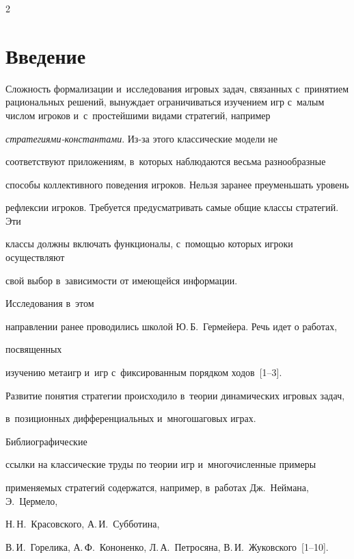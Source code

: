 \thispagestyle{headings}



\begin{multicols}{2}



\label{st\stat}



\section{Введение}



    Сложность формализации и~исследования игровых задач, связанных с~принятием рациональных решений, вынуждает ограничиваться изучением игр с~малым числом игроков и~с~простейшими видами стратегий, например

    \textit{стра\-те\-ги\-ями-констан\-та\-ми}. Из-за этого классические модели не

соответствуют приложениям, в~которых наблюдаются весьма разнообразные

способы коллективного поведения игроков. Нельзя заранее преуменьшать уровень

рефлексии игроков. Требуется предусмат\-ри\-вать самые общие классы стратегий. Эти

классы должны включать функционалы, с~помощью которых игроки осуществляют

свой выбор в~зависимости от имеющейся информации.

Исследования в~этом

направлении ранее проводились школой Ю.\,Б.~Гермейера. Речь идет о работах,

посвященных\linebreak

 изучению метаигр и~игр с~фиксированным порядком ходов~[1--3].

Развитие понятия стратегии происходило в~теории динамических игровых задач,

в~позиционных дифференциальных и~многошаговых играх.



Библиографические

ссылки на классические труды по теории игр и~многочисленные примеры

применяемых стратегий содержатся, например, в~работах Дж.~Неймана, Э.~Цермело,

Н.\,Н.~Красовского, А.\,И.~Субботина,

В.\,И.~Горелика, А.\,Ф.~Кононенко, Л.\,А.~Петросяна, В.\,И.~Жуковского~[1--10].


\end{multicols}

